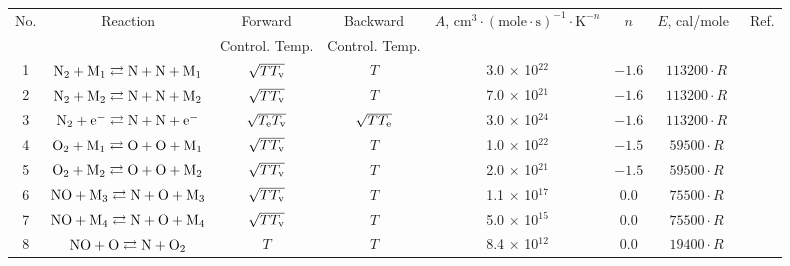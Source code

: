 \documentclass{warpdoc}
\renewcommand{\fontsizetable}{\footnotesize\scalefont{0.9}}
\begin{document}
%
\begin{table}[t]
\fontsizetable
\begin{center}
\begin{threeparttable}
\begin{tabular}{cccccccc} 
\toprule
No. & Reaction\tnote{(b)} & Forward          & Backward    & $A$, $\textrm{cm}^3\cdot(\textrm{mole}\cdot \textrm{s})^{-1}\cdot \textrm{K}^{-n}$ & $n$ & $E$, cal/mole~\tnote{(a)} & Ref.\\ 
~   & ~                   & Control. Temp.   & Control. Temp.\tnote{(c)} &~ & ~ & ~ & ~\\
\midrule
1 & $\rm N_2 + M_1 \rightleftarrows N + N + M_1$ & $\sqrt{T T_{\rm v}}$ & $T$ & 3.0 $\times$ 10$^{22}$  & $-1.6$ & $113200 \cdot R$ & \cite{book:1990:park}\\

2 & $\rm N_2 + M_2 \rightleftarrows N + N + M_2$ & $\sqrt{T T_{\rm v}}$ & $T$ & 7.0 $\times$ 10$^{21}$  & $-1.6$ & $113200 \cdot R$ & \cite{book:1990:park}\\

3 & $\rm N_2 + e^- \rightleftarrows N + N + e^-$ & $\sqrt{T_{\rm e} T_{\rm v}}$ & $\sqrt{T T_{\rm e}}$ & 3.0 $\times$ 10$^{24}$  & $-1.6$ & $113200 \cdot R$ & \cite{book:1990:park}\\

4 & $\rm O_2 + M_1 \rightleftarrows O + O + M_1$ & $\sqrt{T T_{\rm v}}$ & $T$ & 1.0 $\times$ 10$^{22}$  & $-1.5$ & $59500 \cdot R$ & \cite{book:1990:park}\\

5 & $\rm O_2 + M_2 \rightleftarrows O + O + M_2$ & $\sqrt{T T_{\rm v}}$ & $T$ & 2.0 $\times$ 10$^{21}$  & $-1.5$ & $59500 \cdot R$ & \cite{book:1990:park}\\

6 & $\rm NO + M_3 \rightleftarrows N + O + M_3$ & $\sqrt{T T_{\rm v}}$ & $T$ & 1.1 $\times$ 10$^{17}$  & 0.0 & $75500 \cdot R$ & \cite{book:1990:park}\\

7 & $\rm NO + M_4 \rightleftarrows N + O + M_4$ & $\sqrt{T T_{\rm v}}$ & $T$ & 5.0 $\times$ 10$^{15}$  & 0.0 & $75500 \cdot R$ & \cite{book:1990:park}\\



8 & $\rm NO + O \rightleftarrows N + O_2 $ & $T$ & $T$ & 8.4 $\times$ 10$^{12}$  & 0.0 & $19400 \cdot R$ & \cite{jcp:1997:bose}\\


\end{tabular}
\end{threeparttable}
\end{center}
\end{table}
\end{document}
